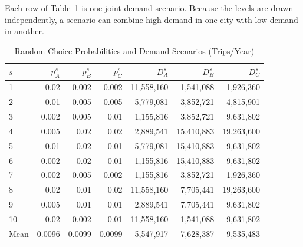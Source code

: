 \documentclass[10pt,a4paper]{article}
\begin{document}
Each row of Table~\ref{tab:an-scenarios} is one joint demand scenario. Because the levels are drawn independently, a scenario can combine high demand in one city with low demand in another.
\begin{table}[H]
\centering\small
\caption{Random Choice Probabilities and Demand Scenarios (Trips/Year)}\label{tab:an-scenarios}
\begin{tabular}{lrrrrrr}
\toprule
$s$ & $p_A^s$ & $p_B^s$ & $p_C^s$ & $D_A^s$ & $D_B^s$ & $D_C^s$\\\midrule
1 & 0.02 & 0.002 & 0.002 & 11,558,160 & 1,541,088 & 1,926,360\\
2 & 0.01 & 0.005 & 0.005 & 5,779,081 & 3,852,721 & 4,815,901\\
3 & 0.002 & 0.005 & 0.01 & 1,155,816 & 3,852,721 & 9,631,802\\
4 & 0.005 & 0.02 & 0.02 & 2,889,541 & 15,410,883 & 19,263,600\\
5 & 0.01 & 0.02 & 0.01 & 5,779,081 & 15,410,883 & 9,631,802\\
6 & 0.002 & 0.02 & 0.01 & 1,155,816 & 15,410,883 & 9,631,802\\
7 & 0.002 & 0.005 & 0.002 & 1,155,816 & 3,852,721 & 1,926,360\\
8 & 0.02 & 0.01 & 0.02 & 11,558,160 & 7,705,441 & 19,263,600\\
9 & 0.005 & 0.01 & 0.01 & 2,889,541 & 7,705,441 & 9,631,802\\
10 & 0.02 & 0.002 & 0.01 & 11,558,160 & 1,541,088 & 9,631,802\\
Mean & 0.0096 & 0.0099 & 0.0099 & 5,547,917 & 7,628,387 & 9,535,483\\
\bottomrule
\end{tabular}
\end{table}
\end{document}
